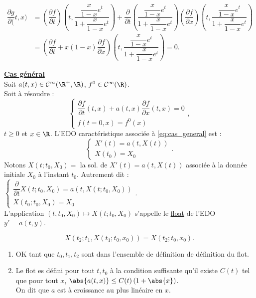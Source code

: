 \documentclass[12pt,a4paper]{article}
\newcommand\diff[2]{\dfrac{\partial #1}{\partial #2}}
\begin{document}
	$\begin{aligned}
		\diff g(t,x) &= \left(\diff ft\right)\left(t,\dfrac{\dfrac x{1-x}e^t}{1+\dfrac x{1-x}e^t}\right) + \diff{}t\left(\dfrac{\dfrac x{1-x}e^t}{1+\dfrac x{1-x}e^t}\right)\left(\diff fx\right)\left(t,\dfrac{\dfrac x{1-x}e^t}{1+\dfrac x{1-x}e^t}\right)\\
		&= \left(\diff ft + x(1-x)\diff fx\right)\left(t,\dfrac{\dfrac x{1-x}e^t}{1+\dfrac x{1-x}e^t}\right) = 0.
	\end{aligned}$
	
	\large{\textbf{\underline{Cas général}}}\\
	
	Soit $a(t,x) \in \mathcal C^\infty(\R^+,\R)$, $f^0 \in \mathcal C^\infty(\R)$.\\
	Soit à résoudre :
	\begin{equation}\label{eq:cas_general}
		\begin{cases}
			\diff ft (t,x) + a(t,x) \diff fx(t,x) = 0\\
			f(t=0,x) = f^0(x)
		\end{cases},
	\end{equation} 
	$t\geq 0$ et $x \in \R$. L'EDO caractéristique associée à \eqref{eq:cas_general} est : 
	\begin{equation}
		\begin{cases}
			X'(t) = a(t,X(t))\\
			X(t_0) = X_0
		\end{cases}.
	\end{equation}
	Notons $X(t;t_0,X_0) = $ la sol. de $X'(t) = a(t,X(t))$ associée à la donnée initiale $X_0$ à l'instant $t_0$. Autrement dit : $\begin{cases}
		\diff{}t X(t;t_0,X_0) = a(t,X(t;t_0,X_0))\\
		X(t_0;t_0,X_0) = X_0
	\end{cases}$.\\ L'application $(t,t_0,X_0) \mapsto X(t;t_0,X_0)$ s'appelle le \underline{\underline{float}} de l'EDO $y' = a(t,y)$.
	
	\begin{thm}
		\begin{equation}
			X(t_2;t_1, X(t_1;t_0,x_0)) = X(t_2;t_0,x_0).
		\end{equation}
	\end{thm}
	
	\begin{enumerate}[label=\textbullet]
		\item  OK tant que $t_0,t_1,t_2$ sont dans l'ensemble de définition de définition du flot.
		\item Le flot es défini pour tout $t,t_0$ à la condition suffisante qu'il existe $C(t)$ tel que pour tout $x$, $\abs{a(t,x)} \leq C(t) \left(1+\abs{x}\right)$.\\
		On dit que $a$ est à croissance au plus linéaire en $x$.
	\end{enumerate}
	
\end{document}

